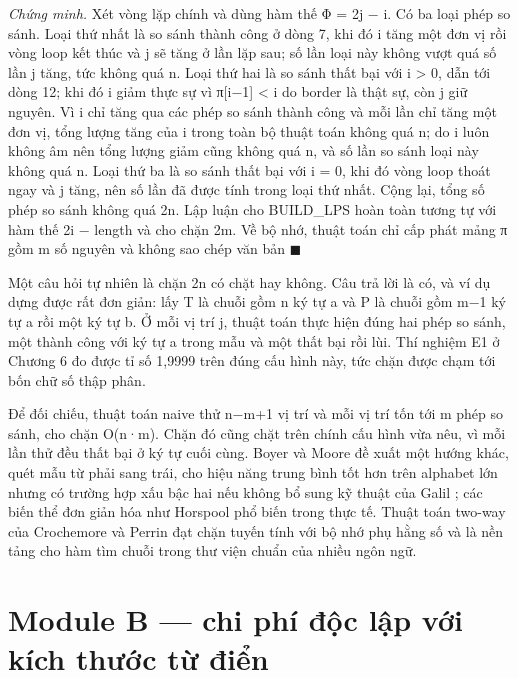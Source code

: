 \emph{Chứng minh.} Xét vòng lặp chính và dùng hàm thế Φ = 2j − i. Có ba
loại phép so sánh. Loại thứ nhất là so sánh thành công ở dòng 7, khi đó
i tăng một đơn vị rồi vòng loop kết thúc và j sẽ tăng ở lần lặp sau; số
lần loại này không vượt quá số lần j tăng, tức không quá n. Loại thứ hai
là so sánh thất bại với i \textgreater{} 0, dẫn tới dòng 12; khi đó i
giảm thực sự vì π{[}i−1{]} \textless{} i do border là thật sự, còn j giữ
nguyên. Vì i chỉ tăng qua các phép so sánh thành công và mỗi lần chỉ
tăng một đơn vị, tổng lượng tăng của i trong toàn bộ thuật toán không
quá n; do i luôn không âm nên tổng lượng giảm cũng không quá n, và số
lần so sánh loại này không quá n. Loại thứ ba là so sánh thất bại với i
= 0, khi đó vòng loop thoát ngay và j tăng, nên số lần đã được tính
trong loại thứ nhất. Cộng lại, tổng số phép so sánh không quá 2n. Lập
luận cho BUILD\_LPS hoàn toàn tương tự với hàm thế 2i − length và cho
chặn 2m. Về bộ nhớ, thuật toán chỉ cấp phát mảng π gồm m số nguyên và
không sao chép văn bản \(\blacksquare\)

Một câu hỏi tự nhiên là chặn 2n có chặt hay không. Câu trả lời là có, và
ví dụ dựng được rất đơn giản: lấy T là chuỗi gồm n ký tự a và P là chuỗi
gồm m−1 ký tự a rồi một ký tự b. Ở mỗi vị trí j, thuật toán thực hiện
đúng hai phép so sánh, một thành công với ký tự a trong mẫu và một thất
bại rồi lùi. Thí nghiệm E1 ở Chương 6 đo được tỉ số 1,9999 trên đúng cấu
hình này, tức chặn được chạm tới bốn chữ số thập phân.

Để đối chiếu, thuật toán naive thử n−m+1 vị trí và mỗi vị trí tốn tới m
phép so sánh, cho chặn O(n·m). Chặn đó cũng chặt trên chính cấu hình vừa
nêu, vì mỗi lần thử đều thất bại ở ký tự cuối cùng. Boyer và Moore
\cite{boyer1977} đề xuất một hướng khác, quét mẫu từ phải sang trái, cho hiệu
năng trung bình tốt hơn trên alphabet lớn nhưng có trường hợp xấu bậc
hai nếu không bổ sung kỹ thuật của Galil \cite{galil1979}; các biến thể đơn giản
hóa như Horspool \cite{horspool1980} phổ biến trong thực tế. Thuật toán two-way của
Crochemore và Perrin \cite{crochemore1991} đạt chặn tuyến tính với bộ nhớ phụ hằng số
và là nền tảng cho hàm tìm chuỗi trong thư viện chuẩn của nhiều ngôn
ngữ.

\section{Module B --- chi phí độc lập với kích thước từ điển}
\label{sec:4-2}

\begin{center}
\end{center}


